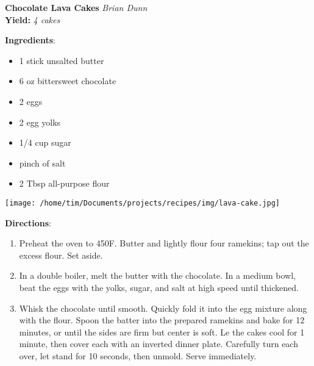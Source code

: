 \documentclass[11pt, twoside, openany]{book}
\begin{document}
\noindent\begin{minipage}[t]{\linewidth}%
{\Large\textbf{Chocolate Lava Cakes}} \label{chocolate-lava-cakes}\hfill\textit{Brian Dunn}\\
\textbf{Yield:} \textit{4 cakes}\\
\noindent\begin{minipage}[t]{0.78\linewidth}%
\textbf{Ingredients}:\vspace{-3mm}
\begin{multicols}{2}
\begin{itemize}\setlength\itemsep{-1mm}
\item 1 stick unsalted butter
\item 6 oz bittersweet chocolate
\item 2 eggs
\item 2 egg yolks
\item 1/4 cup sugar
\item pinch of salt
\item 2 Tbsp all-purpose flour
\end{itemize}
\end{multicols}
\end{minipage}
\noindent\begin{minipage}[t]{0.18\linewidth}
\centering \strut\vspace*{-\baselineskip}\newline
\texttt{[image: /home/tim/Documents/projects/recipes/img/lava-cake.jpg]}\\
\end{minipage}\vspace{3mm}
\textbf{Directions}:
\vspace{-3mm}\begin{enumerate}\setlength\itemsep{-1mm}
\item Preheat the oven to 450F. Butter and lightly flour four ramekins; tap out the excess flour. Set aside.
\item In a double boiler, melt the butter with the chocolate. In a medium bowl, beat the eggs with the yolks, sugar, and salt at high speed until thickened.
\item Whisk the chocolate until smooth. Quickly fold it into the egg mixture along with the flour. Spoon the batter into the prepared ramekins and bake for 12 minutes, or until the sides are firm but center is soft. Le the cakes cool for 1 minute, then cover each with an inverted dinner plate. Carefully turn each over, let stand for 10 seconds, then unmold. Serve immediately.
\end{enumerate}
\end{minipage}\vspace{8mm}
\end{document}
